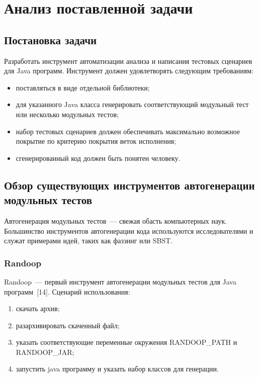 \chapter{Анализ поставленной задачи} 

\section{Постановка задачи}

Разработать инструмент автоматизации анализа и написания тестовых сценариев для Java программ. Инструмент должен удовлетворять следующим требованиям:

\begin{itemize}
	\item поставляться в виде отдельной библиотеки;
	\item для указанного Java класса генерировать соответствующий модульный тест или несколько модульных тестов;
	\item набор тестовых сценариев должен обеспечивать максимально возможное покрытие по критерию покрытия веток исполнения;
	\item сгенерированный код должен быть понятен человеку.
\end{itemize}


\section{Обзор существующих инструментов автогенерации модульных тестов}

Автогенерация модульных тестов~--- свежая обасть компьютерных наук. Большинство инструментов автогенерации кода используются исследователями и служат примерами идей, таких как фаззинг или SBST. 

\subsection{Randoop}

Randoop~--- первый инструмент автогенерации модульных тестов для Java программ~[14]. Сценарий использования: 

\begin{enumerate}
	\item скачать архив;
	\item разархивировать скаченный файл;
	\item указать соответствующие переменные окружения RANDOOP\_PATH и RANDOOP\_JAR;
	\item запустить java программу и указать набор классов для генерации.
\end{enumerate}

